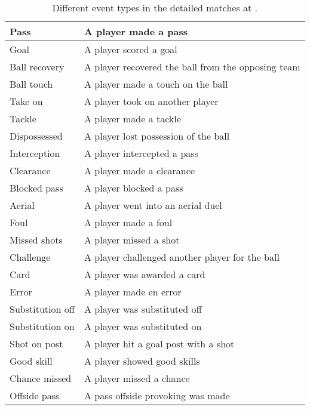 \begin{table}
\begin{tabulary}{\textwidth}{| L | L |}
        Pass                & A player made a pass \\\hline
        Goal                & A player scored a goal \\\hline
        Ball recovery       & A player recovered the ball from the opposing team \\\hline
        Ball touch          & A player made a touch on the ball \\\hline
        Take on             & A player took on another player \\\hline
        Tackle              & A player made a tackle \\\hline
        Dispossessed        & A player lost possession of the ball \\\hline
        Interception        & A player intercepted a pass \\\hline
        Clearance           & A player made a clearance \\\hline
        Blocked pass        & A player blocked a pass \\\hline
        Aerial              & A player went into an aerial duel \\\hline
        Foul                & A player made a foul \\\hline
        Missed shots        & A player missed a shot \\\hline
        Challenge           & A player challenged another player for the ball \\\hline
        Card                & A player was awarded a card \\\hline
        Error               & A player made en error \\\hline
        Substitution off    & A player was substituted off \\\hline
        Substitution on     & A player was substituted on \\\hline
        Shot on post        & A player hit a goal post with a shot \\\hline
        Good skill          & A player showed good skills \\\hline
        Chance missed       & A player missed a chance \\\hline
        Offside pass        & A pass offside provoking was made \\\hline
    \end{tabulary}
    \caption{Different event types in the detailed matches at \whoscored.}
    \label{tab:whoscored-event-types}
\end{table}

